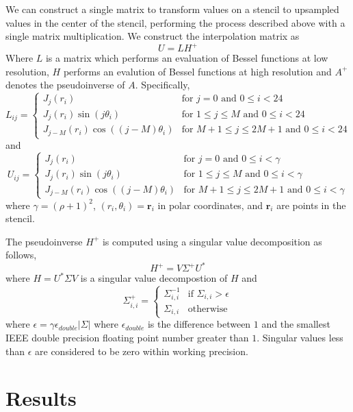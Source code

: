 \documentclass{article}
\newcommand{\rr}[0]{\mathbf{r}}
\begin{document}
We can construct a single matrix to transform values on a stencil to upsampled values in the center of the stencil, performing the process described above with a single matrix multiplication. We construct the interpolation matrix as
\[
U = L H^{+}
\]
Where $L$ is a matrix which performs an evaluation of Bessel functions at low resolution, $H$ performs an evalution of Bessel functions at high resolution and $A^{+}$ denotes the pseudoinverse of $A$. Specifically,
\[
L_{ij} =\begin{cases}
J_{j}(r_{i}) & \text{for } j = 0 \text{ and } 0 \le i < 24\\
J_{j}(r_{i}) \sin{(j \theta_{i})} & \text{for } 1 \le j \le M \text{ and } 0 \le i < 24\\
J_{j-M}(r_{i}) \cos{((j-M) \theta_{i})} & \text{for } M+1 \le j \le 2M+1 \text{ and } 0 \le i < 24
\end{cases}
\]
and
\[
U_{ij} =\begin{cases}
J_{j}(r_{i}) & \text{for } j = 0 \text{ and } 0 \le i < \gamma\\
J_{j}(r_{i}) \sin{(j \theta_{i})} & \text{for } 1 \le j \le M \text{ and } 0 \le i < \gamma\\
J_{j-M}(r_{i}) \cos{((j-M) \theta_{i})} & \text{for } M+1 \le j \le 2M+1 \text{ and } 0 \le i < \gamma
\end{cases}
\]
where $\gamma = (\rho + 1)^{2}$, $(r_{i},\theta_{i}) = \rr_{i}$ in polar coordinates, and $\rr_{i}$ are points in the stencil.

The pseudoinverse $H^{+}$ is computed using a singular value decomposition as follows,
\[
H^{+} = V \Sigma^{+} U^{*}
\]
where $H = U^{*} \Sigma V$ is a singular value decompostion of $H$ and
\[
\Sigma^{+}_{i,i} =\begin{cases}
\Sigma_{i,i}^{-1} & \text{if }\Sigma_{i,i} > \epsilon\\
\Sigma_{i,i} & \text{otherwise}
\end{cases}
\]
where $\epsilon = \gamma \epsilon_{double} \vert \Sigma \vert$ where $\epsilon_{double}$ is the difference between $1$ and the smallest IEEE double precision floating point number greater than $1$. Singular values less than $\epsilon$ are considered to be zero within working precision.

\section*{Results}



\end{document}
